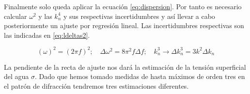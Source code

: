 \vspace{\baselineskip}






Finalmente solo queda aplicar la ecuación \ref{eq:dispersion}. Por tanto es necesario calcular $\omega^2$ y las $k_n^4$ y sus respectivas incertidumbres y así llevar a cabo posteriormente un ajuste por regresión lineal. Las incertidumbres respectivas son las indicadas en \ref{eq:ldeltas2}.

\vspace{\baselineskip}

\begin{equation}\label{eq:ldeltas2}
	(\omega)^2 = (2\pi f)^2;\quad \Delta\omega^2=8\pi^2 f\Delta f;\quad  k_n^3 \rightarrow \Delta k_n^3= 3k^2\Delta k_n
\end{equation}

\vspace{\baselineskip}

La pendiente de la recta de ajuste nos dará la estimación de la tensión superficial del agua $\sigma$. Dado que hemos tomado medidas de hasta máximos de orden tres en el patrón de difracción tendremos tres estimaciones diferentes. 

